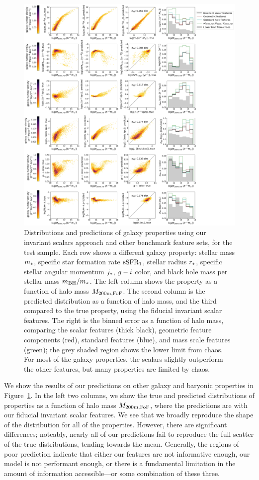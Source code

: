 \begin{figure}
    \centering
    \includegraphics[width=0.87\columnwidth]{pred_galprops.png}
    \caption{Distributions and predictions of galaxy properties using our invariant scalars approach and other benchmark feature sets, for the test sample. 
    Each row shows a different galaxy property: stellar mass $m_*$, specific star formation rate $\mathrm{sSFR}_1$, stellar radius $r_*$, specific stellar angular momentum $j_*$, $g-i$ color, and black hole mass per stellar mass $m_\mathrm{BH}/m_*$. 
    The left column shows the property as a function of halo mass $M_\mathrm{200m,FoF}$. 
    The second column is the predicted distribution as a function of halo mass, and the third compared to the true property, using the fiducial invariant scalar features.
    The right is the binned error as a function of halo mass, comparing the scalar features (thick black), geometric feature components (red), standard features (blue), and mass scale features (green); the grey shaded region shows the lower limit from chaos.
    For most of the galaxy properties, the scalars slightly outperform the other features, but many properties are limited by chaos.
    }
    \label{fig:galprops}
\end{figure}

We show the results of our predictions on other galaxy and baryonic properties in Figure~\ref{fig:galprops}.
In the left two columns, we show the true and predicted distributions of properties as a function of halo mass $M_\mathrm{200m,FoF}$, where the predictions are with our fiducial invariant scalar features.
We see that we broadly reproduce the shape of the distribution for all of the properties. 
However, there are significant differences; noteably, nearly all of our predictions fail to reproduce the full scatter of the true distributions, tending towards the mean.
Generally, the regions of poor prediction indicate that either our features are not informative enough, our model is not performant enough, or there is a fundamental limitation in the amount of information accessible---or some combination of these three.

